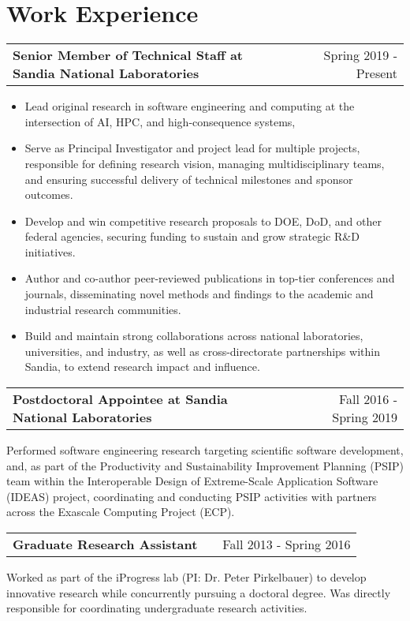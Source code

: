 \documentclass[a4paper,12pt]{article}
\makeatletter
\newenvironment{jobshort}[2]
    {
    \begin{tabularx}{\linewidth}{@{}l X r@{}}
    \textbf{#1} & \hfill &  #2 \\[3.75pt]
    \end{tabularx}
    }
    {
    }
\newenvironment{joblong}[2]
    {
    \begin{tabularx}{\linewidth}{@{}l X r@{}}
    \textbf{#1} & \hfill &  #2 \\[3.75pt]
    \end{tabularx}
    \begin{minipage}[t]{\linewidth}
    \begin{itemize}[nosep,after=\strut, leftmargin=1em, itemsep=3pt,label=--]
    }
    {
    \end{itemize}
    \end{minipage}    
    }
\makeatother
\begin{document}
\section{Work Experience}

\begin{joblong}{Senior Member of Technical Staff at Sandia National Laboratories}{Spring 2019 - Present}
\item Lead original research in software engineering and computing at the intersection of AI, HPC, and high-consequence systems,
\item Serve as Principal Investigator and project lead for multiple projects, responsible for defining research vision, managing multidisciplinary teams, and ensuring successful delivery of technical milestones and sponsor outcomes.
\item Develop and win competitive research proposals to DOE, DoD, and other federal agencies, securing funding to sustain and grow strategic R&D initiatives.
\item Author and co-author peer-reviewed publications in top-tier conferences and journals, disseminating novel methods and findings to the academic and industrial research communities.
\item Build and maintain strong collaborations across national laboratories, universities, and industry, as well as cross-directorate partnerships within Sandia, to extend research impact and influence.
\end{joblong}

\begin{jobshort}{Postdoctoral Appointee at Sandia National Laboratories}{Fall 2016 - Spring 2019}
Performed software engineering research targeting scientific software development, and, as part of the Productivity and Sustainability Improvement Planning (PSIP) team within the Interoperable Design of Extreme-Scale Application Software (IDEAS) project, coordinating and conducting PSIP activities with partners across the Exascale Computing Project (ECP).
\end{jobshort}

\begin{jobshort}{Graduate Research Assistant}{Fall 2013 - Spring 2016}
Worked as part of the iProgress lab (PI: Dr. Peter Pirkelbauer) to develop innovative research while concurrently pursuing a doctoral degree. Was directly responsible for coordinating undergraduate research activities.
\end{jobshort}
\end{document}
